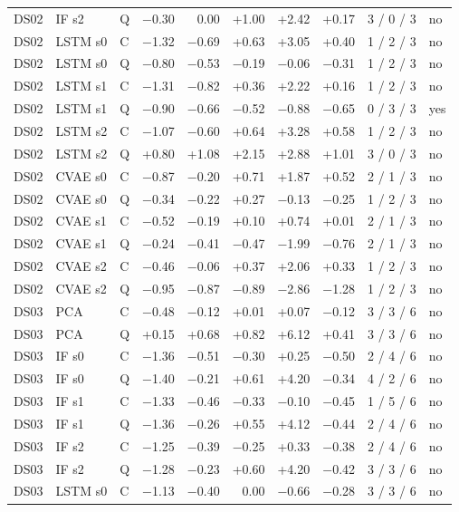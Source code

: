 \documentclass[10pt]{article}
\begin{document}
{\begin{longtable}{lllrrrrrcl}
DS02 & IF s2 & Q & −0.30 & 0.00 & +1.00 & +2.42 & +0.17 & 3 / 0 / 3 & no \\
DS02 & LSTM s0 & C & −1.32 & −0.69 & +0.63 & +3.05 & +0.40 & 1 / 2 / 3 & no \\
DS02 & LSTM s0 & Q & −0.80 & −0.53 & −0.19 & −0.06 & −0.31 & 1 / 2 / 3 & no \\
DS02 & LSTM s1 & C & −1.31 & −0.82 & +0.36 & +2.22 & +0.16 & 1 / 2 / 3 & no \\
DS02 & LSTM s1 & Q & −0.90 & −0.66 & −0.52 & −0.88 & −0.65 & 0 / 3 / 3 & yes \\
DS02 & LSTM s2 & C & −1.07 & −0.60 & +0.64 & +3.28 & +0.58 & 1 / 2 / 3 & no \\
DS02 & LSTM s2 & Q & +0.80 & +1.08 & +2.15 & +2.88 & +1.01 & 3 / 0 / 3 & no \\
DS02 & CVAE s0 & C & −0.87 & −0.20 & +0.71 & +1.87 & +0.52 & 2 / 1 / 3 & no \\
DS02 & CVAE s0 & Q & −0.34 & −0.22 & +0.27 & −0.13 & −0.25 & 1 / 2 / 3 & no \\
DS02 & CVAE s1 & C & −0.52 & −0.19 & +0.10 & +0.74 & +0.01 & 2 / 1 / 3 & no \\
DS02 & CVAE s1 & Q & −0.24 & −0.41 & −0.47 & −1.99 & −0.76 & 2 / 1 / 3 & no \\
DS02 & CVAE s2 & C & −0.46 & −0.06 & +0.37 & +2.06 & +0.33 & 1 / 2 / 3 & no \\
DS02 & CVAE s2 & Q & −0.95 & −0.87 & −0.89 & −2.86 & −1.28 & 1 / 2 / 3 & no \\
\midrule
DS03 & PCA & C & −0.48 & −0.12 & +0.01 & +0.07 & −0.12 & 3 / 3 / 6 & no \\
DS03 & PCA & Q & +0.15 & +0.68 & +0.82 & +6.12 & +0.41 & 3 / 3 / 6 & no \\
DS03 & IF s0 & C & −1.36 & −0.51 & −0.30 & +0.25 & −0.50 & 2 / 4 / 6 & no \\
DS03 & IF s0 & Q & −1.40 & −0.21 & +0.61 & +4.20 & −0.34 & 4 / 2 / 6 & no \\
DS03 & IF s1 & C & −1.33 & −0.46 & −0.33 & −0.10 & −0.45 & 1 / 5 / 6 & no \\
DS03 & IF s1 & Q & −1.36 & −0.26 & +0.55 & +4.12 & −0.44 & 2 / 4 / 6 & no \\
DS03 & IF s2 & C & −1.25 & −0.39 & −0.25 & +0.33 & −0.38 & 2 / 4 / 6 & no \\
DS03 & IF s2 & Q & −1.28 & −0.23 & +0.60 & +4.20 & −0.42 & 3 / 3 / 6 & no \\
DS03 & LSTM s0 & C & −1.13 & −0.40 & 0.00 & −0.66 & −0.28 & 3 / 3 / 6 & no \\

\end{longtable}}
\end{document}
